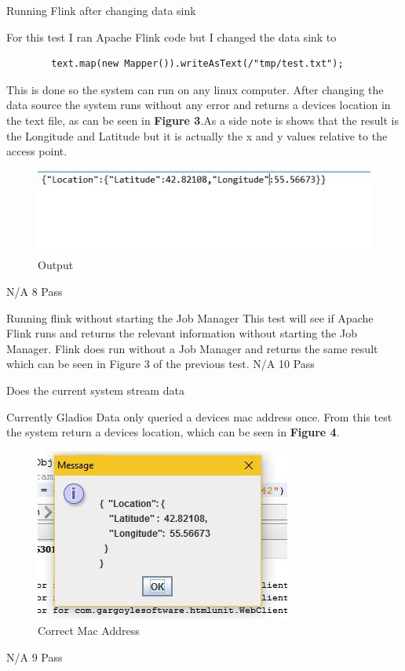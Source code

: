 \FuncReq
{Running Flink after changing data sink}
{	For this test I ran Apache Flink code but I changed the data sink to
	\begin{verbatim}
		text.map(new Mapper()).writeAsText(/"tmp/test.txt");
	\end{verbatim}
	This is done so the system can run on any linux computer. After changing the data source the system runs without any error and returns a devices location in the text file, as can be seen in \textbf{Figure 3}.As a side note is shows that the result is the Longitude and Latitude but it is actually the x and y values relative to the access point.
		\begin{figure}[h]
			\centering
			\includegraphics{functional/images/query_location_results.jpg}
			\caption{Output}
			\label{fig:Output}
		\end{figure} 
}		
{N/A}
{8}
{Pass}
		
\FuncReq
{Running flink without starting the Job Manager}
{This test will see if Apache Flink runs and returns the relevant information without starting the Job Manager. Flink does run without a Job Manager and returns the same result which can be seen in Figure 3 of the previous test.}
{N/A}
{10}
{Pass}

\FuncReq
{Does the current system stream data}
{Currently Gladios Data only queried a devices mac address once. From this test the system return a devices location, which can be seen in \textbf{Figure 4}.
		\begin{figure}[h]
			\centering
			\includegraphics{functional/images/right_mac.jpg}
			\caption{Correct Mac Address}
			\label{fig:right_mac}
		\end{figure} 
}
{N/A}
{9}	
{Pass}	
	
